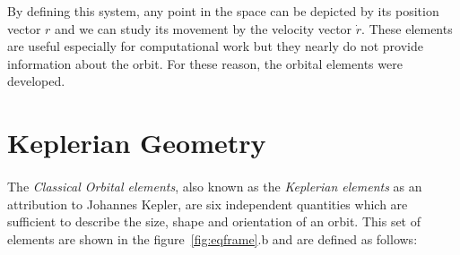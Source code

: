 By defining this system, any point in the space can be depicted by its position vector $r$ and we can study its movement by the velocity vector $\dot{r}$. These elements are useful especially for computational work but they nearly do not provide information about the orbit. For these reason, the orbital elements were developed.

\section{Keplerian Geometry}
\paragraph{}
The \textit{Classical Orbital elements}, also known as the \textit{Keplerian elements} as an attribution to Johannes Kepler, are six independent quantities which are sufficient to describe the size, shape and orientation of an orbit. This set of elements are shown in the figure~\ref{fig:eqframe}.b and are defined as follows:
